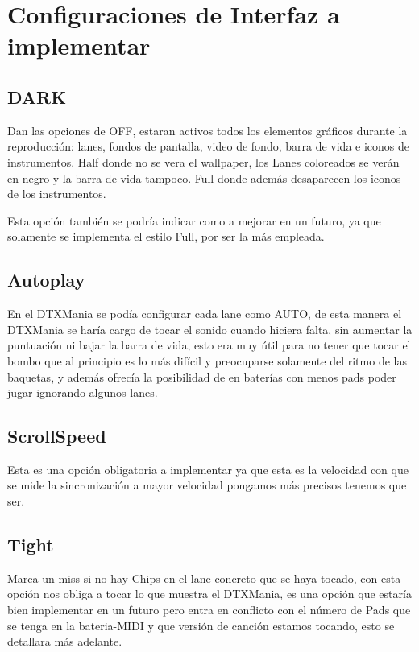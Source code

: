 \documentclass[a4paper,11pt,oneside]{book}
\begin{document}
\section{Configuraciones de Interfaz a implementar}

\subsection{DARK}
Dan las opciones de OFF, estaran activos todos los elementos gráficos durante la reproducción: lanes, fondos de pantalla, video de fondo, barra de vida e iconos de instrumentos.
Half donde no se vera el wallpaper, los \gls{Lanes} coloreados se verán en negro y la barra de vida tampoco.
Full donde además desaparecen los iconos de los instrumentos.

Esta opción también se podría indicar como a mejorar en un futuro, ya que solamente se implementa el estilo Full, por ser la más empleada.

\subsection{Autoplay}
En el DTXMania se podía configurar cada lane como AUTO, de esta manera el DTXMania se haría cargo de tocar el sonido cuando hiciera falta, sin aumentar la puntuación ni bajar la barra de vida, esto era muy útil para no tener que tocar el bombo que al principio es lo más difícil y preocuparse solamente del ritmo de las baquetas, y además ofrecía la posibilidad de en baterías con menos pads poder jugar ignorando algunos lanes.


\subsection{ScrollSpeed}
Esta es una opción obligatoria a implementar ya que esta es la velocidad con que se mide la sincronización a mayor velocidad pongamos más precisos tenemos que ser.

\subsection{Tight}
Marca un miss si no hay \gls{Chips} en el lane concreto que se haya tocado, con esta opción nos obliga a tocar lo que muestra el DTXMania, es una opción que estaría bien implementar en un futuro pero entra en conflicto con el número de \gls{Pads} que se tenga en la bateria-MIDI y que versión de canción estamos tocando, esto se detallara más adelante.
\end{document}
